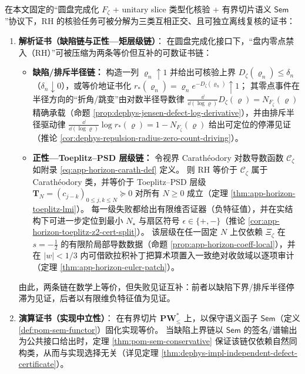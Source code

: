 \begin{theorem}\label{thm:dephys-rh-certificate-audit-loop}
在本文固定的“圆盘完成化 \(F_\zeta\) + unitary slice 类型化核验 + 有界切片语义 \(\mathsf{Sem}\)”协议下，RH 的核验任务可被分解为三类互相正交、且可独立离线复核的证书：
\begin{enumerate}
  \item \textbf{解析证书（缺陷链与正性—矩层级链）}：
  在圆盘完成化接口下，“盘内零点禁入（RH）”可被压缩为两条等价但互补的可数证书链：
  \begin{itemize}
    \item \textbf{缺陷/排斥半径链：}
    构造一列 \(\varrho_n\uparrow 1\) 并给出可核验上界 \(D_\zeta(\varrho_n)\le \delta_n\)（\(\delta_n\downarrow 0\)），或等价地证书化
    \(
    r_{\ast}(\varrho_n)=\varrho_n e^{-D_\zeta(\varrho_n)}\uparrow 1
    \)；
    其零点事件在半径方向的“折角/跳变”由对数半径导数律 \( \frac{\dd}{\dd(\log\varrho)}D_\zeta(\varrho)=N_{F_\zeta}(\varrho) \) 精确承载（命题 \ref{prop:dephys-jensen-defect-log-derivative}），并由排斥半径驱动律 \( \frac{\dd}{\dd(\log\varrho)}\log r_\ast(\varrho)=1-N_{F_\zeta}(\varrho) \) 给出可定位的停滞见证（推论 \ref{cor:dephys-repulsion-radius-zero-count-driving}）。
    \item \textbf{正性—Toeplitz--PSD 层级链：}
    令视界 Carath\'eodory 对数导数函数 \(\mathscr{C}_\zeta\) 如附录 \eqref{eq:app-horizon-carath-def} 定义。
    则 RH 等价于 \(\mathscr{C}_\zeta\) 属于 Carath\'eodory 类，并等价于 Toeplitz--PSD 层级
    \(
    \mathbf{T}_N=(c_{j-k})_{0\le j,k\le N}\succeq 0
    \)
    对所有 \(N\ge 0\) 成立（定理 \ref{thm:app-horizon-toeplitz-lmi}）。
    每一级失败都给出有限维否证器（负特征值），并在实结构下可进一步定位到最小 \(N_\star\) 与扇区符号 \(\epsilon\in\{+,-\}\)（推论 \ref{cor:app-horizon-toeplitz-z2-cert-split}）。
    该层级在任一固定 \(N\) 上仅依赖 \(\Xi_\zeta\) 在 \(s=-\tfrac12\) 的有限阶局部导数数据（命题 \ref{prop:app-horizon-coeff-local}），并在 \(|w|<1/3\) 内可借欧拉积补丁把算术项置入一致绝对收敛域以逐项审计（定理 \ref{thm:app-horizon-euler-patch}）。
  \end{itemize}
  由此，两条链在数学上等价，但失败见证互补：前者以缺陷下界/排斥半径停滞为见证，后者以有限维负特征值为见证。
  \item \textbf{演算证书（实现中立性）}：
  在有界切片 \(\mathbf{PW}^{\ast}_{\le}\) 上，以保守语义函子 \(\mathsf{Sem}\)（定义 \ref{def:pom-sem-functor}）固化实现等价。
  当缺陷上界链以 \(\mathsf{Sem}\) 的签名/谱输出为公共接口给出时，定理 \ref{thm:pom-sem-conservative} 保证该链仅依赖自然同构类，从而与实现选择无关（详见定理 \ref{thm:dephys-impl-independent-defect-certificate}）。

\end{enumerate}
\end{theorem}
